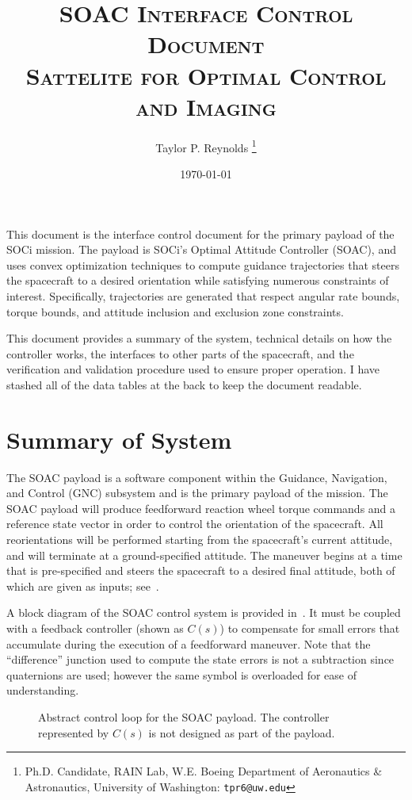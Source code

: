 \documentclass[10pt]{article}
\title{\textsc{SOAC Interface Control Document \\ {\small \textbf{S}attelite for \textbf{O}ptimal \textbf{C}ontrol and \textbf{I}maging}}}
\author{
  Taylor P. Reynolds%
  \thanks{Ph.D. Candidate, RAIN Lab, W.E. Boeing Department of Aeronautics \& Astronautics, University of Washington: \texttt{tpr6@uw.edu} } }
\date{\today}
\begin{document}
 
\maketitle

This document is the interface control document for the primary payload of the SOCi mission. The payload is SOCi's Optimal Attitude Controller (SOAC), and uses convex optimization techniques to compute guidance trajectories that steers the spacecraft to a desired orientation while satisfying numerous constraints of interest. Specifically, trajectories are generated that respect angular rate bounds, torque bounds, and attitude inclusion and exclusion zone constraints. 

This document provides a summary of the system, technical details on how the controller works, the interfaces to other parts of the spacecraft, and the verification and validation procedure used to ensure proper operation. I have stashed all of the data tables at the back to keep the document readable.

\section{Summary of System}\label{sec:summary}

The SOAC payload is a software component within the Guidance, Navigation, and Control (GNC) subsystem and is the primary payload of the mission. The SOAC payload will produce feedforward reaction wheel torque commands and a reference state vector in order to control the orientation of the spacecraft. All reorientations will be performed starting from the spacecraft’s current attitude, and will terminate at a ground-specified attitude. The maneuver begins at a time that is pre-specified and steers the spacecraft to a desired final attitude, both of which are given as inputs; see~.

A block diagram of the SOAC control system is provided in~. It must be coupled with a feedback controller (shown as $C(s)$) to compensate for small errors that accumulate during the execution of a feedforward maneuver. Note that the ``difference'' junction used to compute the state errors is not a subtraction since quaternions are used; however the same symbol is overloaded for ease of understanding.

\begin{figure}[bth]
\centering

\caption{Abstract control loop for the SOAC payload. The controller represented by $C(s)$ is not designed as part of the payload.}
\label{fig:soac_loop}
\end{figure}
\end{document}
